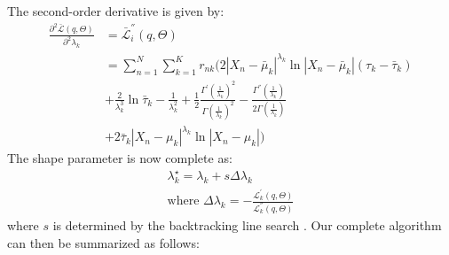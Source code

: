 \documentclass[conference]{IEEEtran}
\begin{document}
        The second-order derivative is given by:
        \begin{equation}
            \begin{split}
                \frac{\partial^2 \bar{\mathcal{L}}(q, \Theta)}{\partial^2 \lambda_k} &= \bar{\mathcal{L}}_i^{''}(q, \Theta)  \\
                &=\sum_{n=1}^{N}\sum_{k=1}^{K} r_{nk}(2 |X_n - \bar{\mu}_k|^{\lambda_k} \ln |X_n - \bar{\mu}_k|(\tau_k - \bar{\tau}_k) \\
                &+ \frac{2}{\lambda_k^3} \ln \bar{\tau}_k - \frac{1}{\lambda_k^2}  + \frac{1}{2}\frac{\Gamma^{'}(\frac{1}{\lambda_k})^2}{\Gamma(\frac{1}{\lambda_k})^2}- \frac{\Gamma^{''}(\frac{1}{\lambda_k})}{2\Gamma(\frac{1}{\lambda_k})} \\
                &+ 2\bar{\tau}_k|X_n - \mu_k|^{\lambda_k} \ln |X_n - \mu_k|)  
            \end{split}
        \end{equation}
        The shape parameter is now complete as:
        \begin{equation}
            \begin{split}\label{lambda}
                \lambda_k^\star = \lambda_k + s \Delta \lambda_k   \\
                \text{where }
                \Delta\lambda_k = - \frac{\mathcal{L}^{'}_k(q, \Theta)}{\mathcal{L}^{''}_k(q, \Theta)}
            \end{split}
        \end{equation}
        where $s$ is determined by the backtracking line search \cite{b6}. Our complete algorithm can then be summarized as follows: 
        
\end{document}
